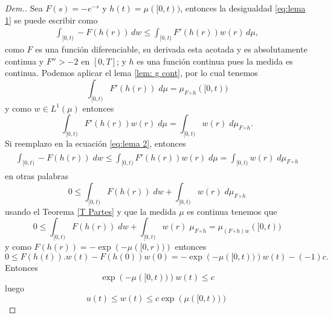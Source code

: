 \begin{proof}[Dem.]
	
 Sea $F(s)=-e^{-s}$ y $h(t)=\mu([0,t))$, entonces la desigualdad \ref{eq:lema 1} se puede escribir como 
 \begin{equation}
     \begin{split}
         \int_{[0,t)}-F(h(r))\, dw\leq \int_{[0,t)}F'(h(r))w(r)\, d\mu, \label{eq:lema 2}
     \end{split}
 \end{equation}
 como $F$ es una función diferenciable, su derivada esta acotada y es absolutamente continua y $F''>-2$ en $[0,T]$; y $h$ es una función continua pues la medida es continua. Podemos aplicar el lema \ref{lem: g cont}, por lo cual tenemos 
 \begin{equation*}
 	\int_{[0,t)} F'(h(r)) \; d\mu= \mu_{F\circ h}([0,t))
 \end{equation*} 
y como $w\in L^1(\mu)$ entonces
\begin{equation*}
	  \int_{[0,t)} F'(h(r)) w(r)\; d\mu= \int_{[0,t)}w(r)\; d\mu_{F\circ h}.
\end{equation*}
Si reemplazo en la ecuación \ref{eq:lema 2}, entonces
\begin{multline*}
    \begin{split}
	\int_{[0,t)}-F\left( h(r)\right)\; dw \leq \int_{[0,t)}F'\left( h(r)\right)w(r)\; d\mu
	= 	\int_{[0,t)}w(r)\; d\mu_{F\circ h}
 \end{split}
\end{multline*}
en otras palabras
\begin{equation*}
	0\leq\int_{[0,t)}F(h(r))\; dw+  \int_{[0,t)}w(r)\; d\mu_{F\circ h}
\end{equation*}
 usando el Teorema \ref{T Partes} y que la medida $\mu$ es continua tenemos que 
\begin{equation*}
	0\leq\int_{[0,t)}F(h(r))\; dw+  \int_{[0,t)}w(r)\; \mu_{F\circ h}=\mu_{(F\circ h)w}([0,t))    
 \end{equation*}
 y como $F(h(r))=-\exp{\left(-\mu([0,r))\right)}$ entonces
 \begin{equation*}
	0\leq F(h(t)).w(t)-F(h(0))w(0)=-\exp\left( -\mu([0,t))\right)w(t) -(-1)c.
\end{equation*}
Entonces
	$$\exp\left( -\mu([0,t))\right)w(t) \leq c$$
luego 
 $$u(t)\leq w(t)\leq c\exp\left( \mu([0,t))\right) $$
\end{proof}

